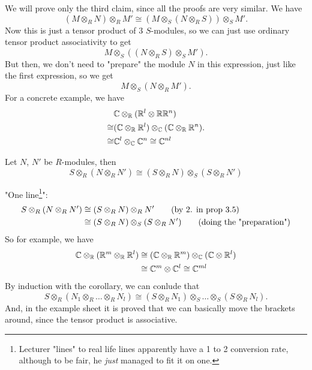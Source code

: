 \documentclass{article}
\begin{document}
\newpage
\proof \hspace{0.1cm} We will prove only the third claim, since all the proofs are very similar. We have \[ (M \otimes_{R} N) \otimes_{R} M' \cong \left( M \otimes_{S} (N \otimes_{R} S)\right) \otimes_{S} M'.\] Now this is just a tensor product of $3$ $S$-modules, so we can just use ordinary tensor product associativity to get \[ M \otimes_{S} \left((N \otimes_{R} S) \otimes_{S} M'\right).\]
But then, we don't need to "prepare" the module $N$ in this expression, just like the first expression, so we get \[ M \otimes _{S} (N \otimes_{R} M').\] 
\endproof
For a concrete example, we have \begin{align*} 
    &\mathbb{C} \otimes_{\mathbb{R}} (\mathbb{R}^{l} \otimes{\mathbb{R}} \mathbb{R}^{n})\\
    \cong & (\mathbb{C} \otimes_{\mathbb{R}} \mathbb{R}^{l}) \otimes_{\mathbb{C}} (\mathbb{C} \otimes_{\mathbb{R}} \mathbb{R}^{n}).\\
    \cong & \mathbb{C}^{l} \otimes_{\mathbb{C}} \mathbb{C}^{n} \cong \mathbb{C}^{nl}
\end{align*}
\begin{corr}{}
    Let $N$, $N'$ be $R$-modules, then \[ S \otimes_{R} (N \otimes_{R} N') \cong (S \otimes_{R} N) \otimes_{S} (S \otimes_{R} N')\]
\end{corr}
\proof "One line\footnote{Lecturer "lines" to real life lines apparently have a 1 to 2 conversion rate, although to be fair, he \textit{just} managed to fit it on one.}":
 \begin{align*}
    S \otimes_{R} (N \otimes_{R} N') &\cong (S \otimes_{R} N) \otimes_{R} N' \tag{\text{by 2. in prop 3.5}}\\
    &\cong (S \otimes_{R} N) \otimes_{S} (S \otimes_{R} N') \tag{doing the "preparation"}
\end{align*}
\endproof
\newlec So for example, we have \begin{align*}
    \mathbb{C} \otimes_{\mathbb{R}} (\mathbb{R}^{m} \otimes_{\mathbb{R}} \mathbb{R}^{l}) &\cong (\mathbb{C} \otimes_{\mathbb{R}} \mathbb{R}^{m}) \otimes_{\mathbb{C}} (\mathbb{C} \otimes \mathbb{R}^{l})\\
    &\cong \mathbb{C}^{m} \otimes \mathbb{C}^{l} \cong \mathbb{C}^{ml}
\end{align*}
By induction with the corollary, we can conlude that \[ S \otimes_{R} (N_{1} \otimes_{R} \dots \otimes_{R} N_{l}) \cong (S \otimes_{R} N_{1}) \otimes_{S} \dots \otimes_{S} (S \otimes_{R} N_{l}). \] And, in the example sheet it is proved that we can basically move the brackets around, since the tensor product is associative.
\end{document}
